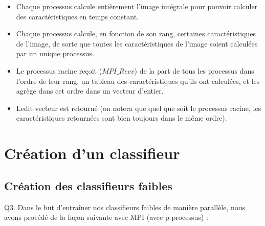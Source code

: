 \documentclass[a4paper,11pt]{article}
\begin{document}
\begin{itemize}
	\item Chaque processus calcule entièrement l’image intégrale pour pouvoir calculer des caractéristiques en temps constant. \\
	\item Chaque processus calcule, en fonction de son rang, certaines caractéristiques de l’image, de sorte que toutes les caractéristiques de l’image soient calculées par un unique processus. \\
	\item Le processus racine reçoit ($MPI\_Recv$) de la part de tous les processus dans l’ordre de leur rang, un tableau des caractéristiques qu’ils ont calculées, et les agrège dans cet ordre dans un vecteur d’entier.\\
	\item Ledit vecteur est retourné (on notera que quel que soit le processus racine, les caractéristiques retournées sont bien toujours dans le même ordre).\\
\end{itemize}

\section{Création d'un classifieur}
\subsection{Création des classifieurs faibles}
Q3. Dans le but d’entraîner nos classifieurs faibles de manière parallèle, nous avons procédé de la façon suivante avec MPI (avec p processus) : \\
\end{document}
